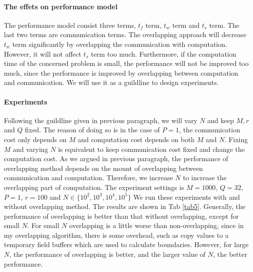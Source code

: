 \paragraph{The effets on performance model} The performance model consist three terms, $t_f$ term, $t_w$ term
and $t_s$ term. The last two terms are communication terms. The overlapping approach will decrease $t_w$ term 
significantly by overlapping the communication with computation. However, it will not affect $t_s$ term too much.
Furthermore, if the computation time of the concerned problem is small, the performance will not be improved too much, since the performance is improved by overlapping between computation and communication. We will use it as a guildline to design experiments.

%

\paragraph{Experiments} Following the guildline given in previous paragraph, we will vary $N$ and keep $M, r$ and $Q$ fixed. 
The reason of doing so  is in the case of $P=1$, the communication cost only 
depends on $M$ and computation cost depends on both $M$ and $N$. Fixing $M$ and varying $N$ is equivalent to keep communication cost fixed and change the computation cost.
As we argued in previous paragraph, the performance of overlapping method depends on the mount of overlapping between communication and computation. Therefore, we increase $N$ to increase the overlapping part of computation. The experiment settings is $M=1000$, $Q=32$, $P=1$, $r=100$ and $N\in \{10^2, 10^3,10^4, 10^5\}$
We run these experiments with and without overlapping method. The results are shown in Tab \ref{tab5}. Generally, the performance of 
overlapping is better than that without overlapping, except for small $N$. For small $N$ overlapping is a little worse than non-overlapping, since
in my overlapping algorithm, there is some overhead, such as copy values to a temporary field buffers which are used to calculate
boundaries. However, for large $N$, the performance of overlapping is better, and the larger value of $N$, the better performance.

